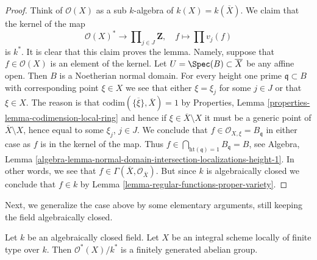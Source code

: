 \begin{proof}
\medskip\noindent
Think of $\mathcal{O}(X)$ as a sub $k$-algebra of $k(X) = k(\overline{X})$.
We claim that the kernel of the map
$$
\mathcal{O}(X)^* \longrightarrow
\prod\nolimits_{j \in J} \mathbf{Z},
\quad
f \longmapsto \prod v_j(f)
$$
is $k^*$. It is clear that this claim proves the lemma.
Namely, suppose that $f \in \mathcal{O}(X)$ is an element of the kernel.
Let $U = \Spec(B) \subset \overline{X}$ be any affine open.
Then $B$ is a Noetherian normal domain.
For every height one prime $\mathfrak q \subset B$ with corresponding
point $\xi \in X$ we see that either $\xi = \xi_j$ for some $j \in J$
or that $\xi \in X$. The reason is that
$\text{codim}(\overline{\{\xi\}}, \overline{X}) = 1$ by
Properties, Lemma \ref{properties-lemma-codimension-local-ring}
and hence if $\xi \in \overline{X} \setminus X$ it must be a
generic point of $\overline{X} \setminus X$, hence equal to some
$\xi_j$, $j \in J$.
We conclude that $f \in \mathcal{O}_{X, \xi} = B_{\mathfrak q}$
in either case as $f$ is in the kernel of the map. Thus
$f \in \bigcap_{\text{ht}(\mathfrak q) = 1} B_{\mathfrak q} = B$, see
Algebra, Lemma
\ref{algebra-lemma-normal-domain-intersection-localizations-height-1}.
In other words, we see that
$f \in \Gamma(\overline{X}, \mathcal{O}_{\overline{X}})$.
But since $k$ is algebraically closed we conclude that
$f \in k$ by
Lemma \ref{lemma-regular-functions-proper-variety}.
\end{proof}

\noindent
Next, we generalize the case above by some elementary arguments, still
keeping the field algebraically closed.

\begin{lemma}
\label{lemma-units-integral-finite-type-algebraically-closed}
Let $k$ be an algebraically closed field.
Let $X$ be an integral scheme locally of finite type over $k$.
Then $\mathcal{O}^*(X)/k^*$ is a finitely generated abelian group.
\end{lemma}

